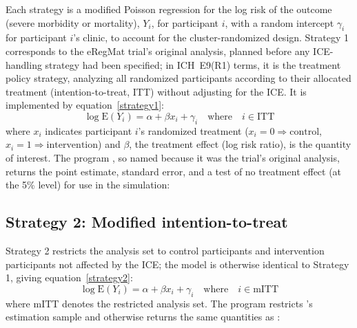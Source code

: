 Each strategy is a modified Poisson regression for the log risk of the
outcome (severe morbidity or mortality), $Y_i$, for participant $i$, with
a random intercept $\gamma_i$ for participant $i$'s clinic, to account for
the cluster-randomized design. Strategy 1 corresponds to the eRegMat
trial's original analysis, planned before any ICE-handling strategy had
been specified; in ICH~E9(R1) terms, it is the treatment policy strategy,
analyzing all randomized participants according to their allocated
treatment (intention-to-treat, ITT) without adjusting for the ICE. It is
implemented by equation~\eqref{strategy1}:
%
\begin{equation}\label{strategy1}
  \log \mathrm{E}(Y_i) = \alpha + \beta x_i + \gamma_i \quad \mathrm{where}\quad i \in \mathrm{ITT}
\end{equation}
%
where $x_i$ indicates participant $i$'s randomized treatment
($x_i\!=\!0\!\Rightarrow\!\mathrm{control}$,
$x_i\!=\!1\!\Rightarrow\!\mathrm{intervention}$) and $\beta$, the treatment
effect (log risk ratio), is the quantity of interest. The program
, so named because it was the trial's
original analysis, returns the point estimate, standard error, and a test
of no treatment effect (at the 5\% level) for use in the simulation:

\begin{minipage}{\linewidth}
\begin{stlog}
\nullskip
\end{stlog}
\end{minipage}

\subsection{Strategy 2: Modified intention-to-treat}

Strategy 2 restricts the analysis set to control participants and
intervention participants not affected by the ICE; the model is otherwise
identical to Strategy 1, giving equation~\eqref{strategy2}:
%
\begin{equation}\label{strategy2}
  \log \mathrm{E}(Y_i) = \alpha + \beta x_i + \gamma_i \quad \mathrm{where}\quad i \in \mathrm{mITT}
\end{equation}
%
where $\mathrm{mITT}$ denotes the restricted analysis set. The program
 restricts 's estimation sample
and otherwise returns the same quantities as :

